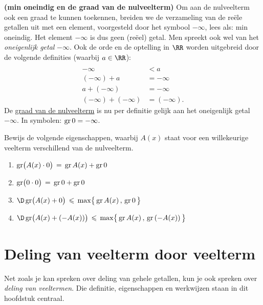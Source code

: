 \documentclass{ximera}
\begin{document}
\begin{Uitbreiding}
\begin{Oefening}%
\label{oefgraadnulveelterm}
{\bf (min oneindig en de graad van de nulveelterm)} 
Om aan de nulveelterm ook een graad te kunnen toekennen, breiden we de verzameling van de re\"ele getallen uit met een element, voorgesteld door het symbool $- \infty$, lees als: min oneindig. Het element $-\infty$ is dus geen (re\"eel) getal. Men spreekt ook wel van het {\em oneigenlijk getal} $-\infty$. Ook de orde en de optelling in $\RR$ worden uitgebreid door de volgende definities (waarbij $a \in \RR$):
\[
\begin{aligned}
\\[-0.5cm]
-\infty & < a \\
(-\infty) + a & = -\infty \\
a + (-\infty) & = -\infty \\
(-\infty) + (-\infty) & = (-\infty).
\end{aligned}
\]
De \underline{graad van de nulveelterm} is nu per definitie gelijk aan het oneigenlijk getal $-\infty$. In symbolen: $\operatorname{gr} 0 = - \infty$.

Bewijs de volgende eigenschappen, waarbij $A(x)$ staat voor een willekeurige veelterm verschillend van de nulveelterm.
\begin{enumerate}

\item
$\operatorname{gr}\bigl( A(x) \cdot 0 \bigr) \, = \, \operatorname{gr} A(x) + \operatorname{gr} 0$
\item
$\operatorname{gr}\bigl( 0 \cdot 0 \bigr) \, = \, \operatorname{gr} 0 + \operatorname{gr} 0$
\item
$\D \gr\bigl( A(x) + 0 \bigr) \, \leq \, \max \bigl\{ \,\gr A(x)\, , \, \gr 0 \, \bigr\}$
\item
$\D \gr\bigl( A(x) + (-A(x)) \bigr) \, \leq \, \max \bigl\{ \,\gr A(x)\, , \, \gr \left(-A(x)\right) \, \bigr\}$
\end{enumerate}
\end{Oefening}
\end{Uitbreiding}



\chapter{Deling van veelterm door veelterm}\label{hoofdstuk:2}

Net zoals je kan spreken over deling van gehele getallen, kun je ook spreken over {\em deling van veeltermen}. Die definitie, eigenschappen en werkwijzen staan in dit hoofdstuk centraal. 
\end{document}
